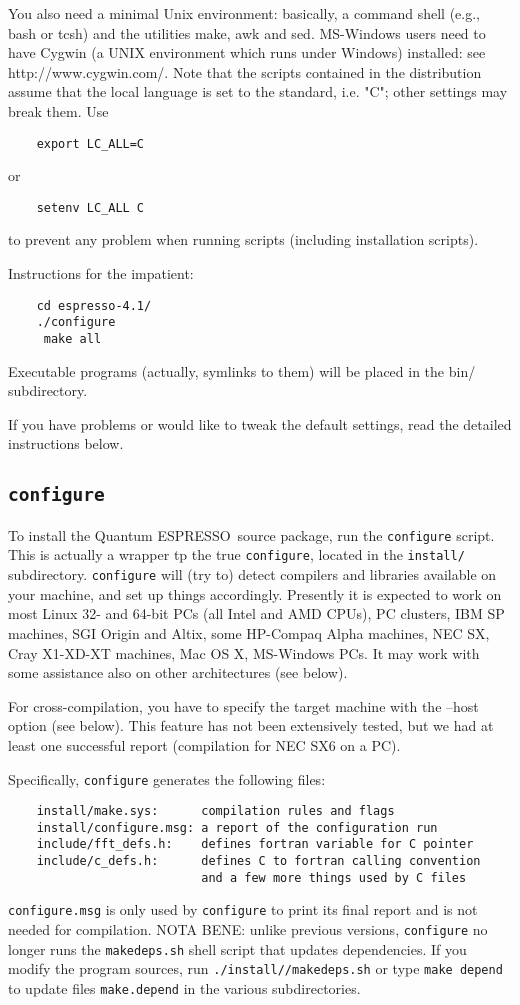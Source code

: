 \documentclass[12pt,a4paper]{article}
\def\qe{{\sc Quantum ESPRESSO}}
\begin{document}
You also need a minimal Unix environment: basically, a command shell (e.g.,
bash or tcsh) and the utilities make, awk and sed. MS-Windows users need
to have Cygwin (a UNIX environment which runs under Windows) installed:
see http://www.cygwin.com/. Note that the scripts contained in the distribution
assume that the local  language is set to the standard, i.e. "C"; other
 settings 
may break them. Use
\begin{verbatim}
    export LC_ALL=C
\end{verbatim}
or
\begin{verbatim}
    setenv LC_ALL C
\end{verbatim}
to prevent any problem when running scripts (including installation scripts).

Instructions for the impatient:
\begin{verbatim}
    cd espresso-4.1/
    ./configure
     make all
\end{verbatim}
Executable programs (actually, symlinks to them) will be placed in the bin/
subdirectory.
    
If you have problems or would like to tweak the default settings, read the
detailed instructions below.

\subsection{\texttt{configure}}

To install the \qe\ source package, run the \texttt{configure}
script. This is actually a wrapper tp the true \texttt{configure},
located in the \texttt{install/} subdirectory. \texttt{configure}
will (try to) detect compilers and libraries available on
your machine, and set up things accordingly. Presently it is expected
to work on most Linux 32- and 64-bit PCs (all Intel and AMD CPUs), PC
clusters, IBM SP machines, SGI Origin and Altix, some HP-Compaq Alpha
machines, NEC SX, Cray X1-XD-XT machines, Mac OS X, 
MS-Windows PCs. It may work with
some assistance also on other architectures (see below). 
    
For cross-compilation, you have to specify the target machine with the
--host option (see below). This feature has not been extensively
tested, but we had at least one successful report (compilation for NEC
SX6 on a PC). 
    
Specifically, \texttt{configure} generates the following files:
\begin{verbatim}
    install/make.sys:      compilation rules and flags
    install/configure.msg: a report of the configuration run
    include/fft_defs.h:    defines fortran variable for C pointer
    include/c_defs.h:      defines C to fortran calling convention
                           and a few more things used by C files
\end{verbatim}
\texttt{configure.msg} is only used by \texttt{configure} to print its final 
report and is not needed for compilation. NOTA BENE: unlike previous
versions, \texttt{configure} no longer runs the \texttt{makedeps.sh} 
shell script that updates dependencies. If you modify the program 
sources, run \texttt{./install//makedeps.sh} or type \texttt{make depend}
to update files \texttt{make.depend} in the various subdirectories.
    
\end{document}
